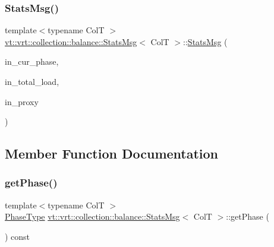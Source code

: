\subsubsection{\texorpdfstring{Stats\+Msg()}{StatsMsg()}\hspace{0.1cm}{\footnotesize\ttfamily [2/2]}}
{\footnotesize\ttfamily template$<$typename ColT $>$ \\
\hyperlink{structvt_1_1vrt_1_1collection_1_1balance_1_1_stats_msg}{vt\+::vrt\+::collection\+::balance\+::\+Stats\+Msg}$<$ ColT $>$\+::\hyperlink{structvt_1_1vrt_1_1collection_1_1balance_1_1_stats_msg}{Stats\+Msg} (\begin{DoxyParamCaption}\item[{\hyperlink{namespacevt_a46ce6733d5cdbd735d561b7b4029f6d7}{Phase\+Type} const \&}]{in\+\_\+cur\+\_\+phase,  }\item[{\hyperlink{namespacevt_a876a9d0cd5a952859c72de8a46881442}{Time\+Type} const \&}]{in\+\_\+total\+\_\+load,  }\item[{\hyperlink{structvt_1_1vrt_1_1collection_1_1balance_1_1_stats_msg_a6f88a58947e0a02b3f7dcfec8b91b5fd}{Proxy\+Type} const \&}]{in\+\_\+proxy }\end{DoxyParamCaption})\hspace{0.3cm}{\ttfamily [inline]}}



\subsection{Member Function Documentation}
\mbox{\label{structvt_1_1vrt_1_1collection_1_1balance_1_1_stats_msg_a81328064a6ff12f8ae9629bdb400836e}} 
\subsubsection{\texorpdfstring{get\+Phase()}{getPhase()}}
{\footnotesize\ttfamily template$<$typename ColT $>$ \\
\hyperlink{namespacevt_a46ce6733d5cdbd735d561b7b4029f6d7}{Phase\+Type} \hyperlink{structvt_1_1vrt_1_1collection_1_1balance_1_1_stats_msg}{vt\+::vrt\+::collection\+::balance\+::\+Stats\+Msg}$<$ ColT $>$\+::get\+Phase (\begin{DoxyParamCaption}{ }\end{DoxyParamCaption}) const\hspace{0.3cm}{\ttfamily [inline]}}

